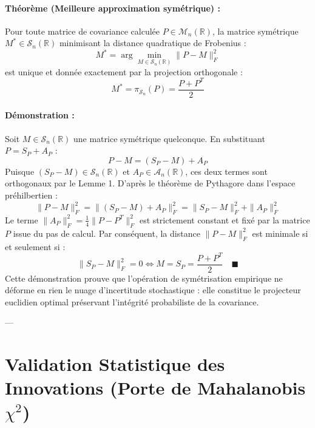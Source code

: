 \documentclass[../Formulations_Kalman.tex]{subfiles}
\begin{document}
\paragraph{Théorème (Meilleure approximation symétrique) :}
Pour toute matrice de covariance calculée $P \in \mathcal{M}_n(\mathbb{R})$, la matrice symétrique $M^* \in \mathcal{S}_n(\mathbb{R})$ minimisant la distance quadratique de Frobenius :
\begin{equation}
M^* = \arg\min_{M \in \mathcal{S}_n(\mathbb{R})} \|P - M\|_F^2
\end{equation}
est unique et donnée exactement par la projection orthogonale :
\begin{equation}
\boxed{M^* = \pi_{\mathcal{S}_n}(P) = \frac{P + P^T}{2}}
\end{equation}

\paragraph{Démonstration :}
Soit $M \in \mathcal{S}_n(\mathbb{R})$ une matrice symétrique quelconque. En substituant $P = S_P + A_P$ :
\begin{equation}
P - M = (S_P - M) + A_P
\end{equation}
Puisque $(S_P - M) \in \mathcal{S}_n(\mathbb{R})$ et $A_P \in \mathcal{A}_n(\mathbb{R})$, ces deux termes sont orthogonaux par le Lemme 1. D'après le théorème de Pythagore dans l'espace préhilbertien :
\begin{equation}
\|P - M\|_F^2 = \|(S_P - M) + A_P\|_F^2 = \|S_P - M\|_F^2 + \|A_P\|_F^2
\end{equation}
Le terme $\|A_P\|_F^2 = \frac{1}{4}\|P - P^T\|_F^2$ est strictement constant et fixé par la matrice $P$ issue du pas de calcul. Par conséquent, la distance $\|P - M\|_F^2$ est minimale si et seulement si :
\begin{equation}
\|S_P - M\|_F^2 = 0 \iff M = S_P = \frac{P + P^T}{2} \quad \blacksquare
\end{equation}
Cette démonstration prouve que l'opération de symétrisation empirique ne déforme en rien le nuage d'incertitude stochastique : elle constitue le projecteur euclidien optimal préservant l'intégrité probabiliste de la covariance.

---

\newpage
\section{\texorpdfstring{Validation Statistique des Innovations (Porte de Mahalanobis $\chi^2$)}{Validation Statistique des Innovations (Porte de Mahalanobis Chi-2)}}
\label{annexe:chi2}
\end{document}

